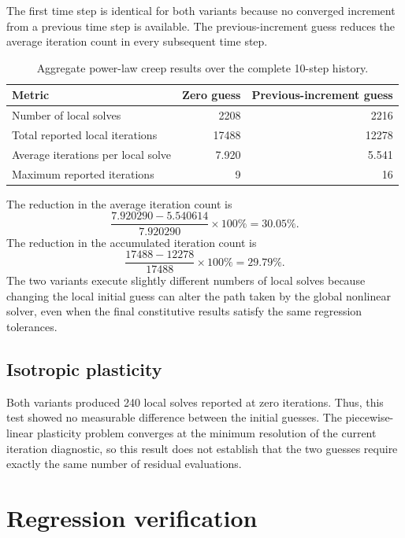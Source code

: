 \documentclass[11pt]{article}
\begin{document}
The first time step is identical for both variants because no converged increment from a previous time step is available.  The previous-increment guess reduces the average iteration count in every subsequent time step.

\begin{table}[htbp]
  \centering
  \caption{Aggregate power-law creep results over the complete 10-step history.}
  \label{tab:creep-total}
  \begin{tabular}{lrr}
    \toprule
    Metric & Zero guess & Previous-increment guess \\
    \midrule
    Number of local solves & 2208 & 2216 \\
    Total reported local iterations & 17488 & 12278 \\
    Average iterations per local solve & 7.920 & 5.541 \\
    Maximum reported iterations & 9 & 16 \\
    \bottomrule
  \end{tabular}
\end{table}

The reduction in the average iteration count is
\begin{equation}
  \frac{7.920290 - 5.540614}{7.920290}\times 100\% = 30.05\%.
\end{equation}
The reduction in the accumulated iteration count is
\begin{equation}
  \frac{17488 - 12278}{17488}\times 100\% = 29.79\%.
\end{equation}
The two variants execute slightly different numbers of local solves because changing the local initial guess can alter the path taken by the global nonlinear solver, even when the final constitutive results satisfy the same regression tolerances.

\subsection{Isotropic plasticity}

Both variants produced 240 local solves reported at zero iterations.  Thus, this test showed no measurable difference between the initial guesses.  The piecewise-linear plasticity problem converges at the minimum resolution of the current iteration diagnostic, so this result does not establish that the two guesses require exactly the same number of residual evaluations.

\section{Regression verification}
\end{document}
